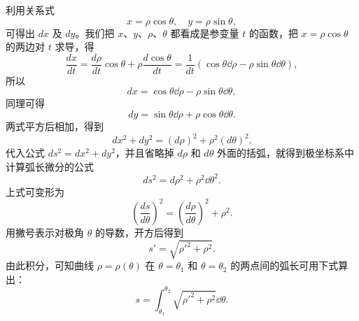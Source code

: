 利用关系式
\[
  x = \rho\cos\theta,\quad y = \rho\sin\theta,
\]
可得出 $dx$ 及 $dy$。我们把 $x$、$y$、$\rho$、$\theta$ 都看成是参变量 $t$ 的函数，把 $x = \rho\cos\theta$ 的两边对 $t$ 求导，得
\[
  \frac{dx}{dt} = \frac{d\rho}{dt}\cos\theta + \rho\frac{d\cos\theta}{dt} = \frac{1}{dt}(\cos\theta\dd\rho - \rho\sin\theta\dd\theta),
\]
所以
\[
  dx = \cos\theta\dd\rho - \rho\sin\theta\dd\theta,
\]
同理可得
\[
  dy = \sin\theta\dd\rho + \rho\cos\theta\dd\theta.
\]
两式平方后相加，得到
\[
  dx^2 + dy^2 = (d\rho)^2 + \rho^2(d\theta)^2.
\]
代入公式 $ds^2 = dx^2 + dy^2$，并且省略掉 $d\rho$ 和 $d\theta$ 外面的括弧，就得到极坐标系中计算弧长微分的公式
\[
  ds^2 = d\rho^2 + \rho^2\dd\theta^2.
\]
上式可变形为
\[
  \left(\frac{ds}{d\theta}\right)^2 = \left(\frac{d\rho}{d\theta}\right)^2 + \rho^2.
\]
用撇号表示对极角 $\theta$ 的导数，开方后得到
\[
  s' = \sqrt{\rho'^2 + \rho^2}.
\]
由此积分，可知曲线 $\rho = \rho(\theta)$ 在 $\theta = \theta_1$ 和 $\theta = \theta_2$ 的两点间的弧长可用下式算出：
\[
  s = \int_{\theta_1}^{\theta_2} \sqrt{\rho'^2 + \rho^2}\dd\theta.
\]

